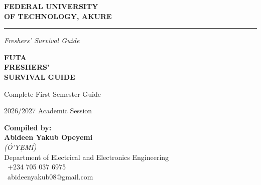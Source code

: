 \documentclass[11pt,a4paper]{article}
\begin{document}
\begin{titlepage}
    \centering


    \vspace*{1cm}

    {\color{white}\Huge\bfseries FEDERAL UNIVERSITY\\[0.3em] OF TECHNOLOGY, AKURE\par}

    \vspace{1cm}

    {\color{accent}\rule{10cm}{2pt}\par}

    \vspace{0.5cm}

    {\color{white}\Large\itshape Freshers' Survival Guide\par}

    \vspace{2cm}

    {\color{primary}\Huge\bfseries FUTA\\[0.3em] FRESHERS'\\[0.3em] SURVIVAL GUIDE\par}

    \vspace{0.5cm}

    {\color{primary}\Large Complete First Semester Guide\par}

    \vspace{0.3cm}

    {\color{textGray}\large 2026/2027 Academic Session\par}

    \vspace{2cm}

    \begin{tcolorbox}[colback=lightGray, colframe=primary, width=12cm, arc=6pt, boxsep=10pt]
        \centering
        {\color{primary}\textbf{Compiled by:}}\\[0.3em]
        {\Large\bfseries Abideen Yakub Opeyemi}\\[0.2em]
        {\itshape (Ó'YẸMÍ)}\\[0.5em]
        {\small Department of Electrical and Electronics Engineering}\\[0.3em]
        {\small\faPhone\ +234 705 037 6975}\\[0.2em]
        {\small\faEnvelope\ abideenyakub08@gmail.com}
    \end{tcolorbox}


\end{titlepage}
\end{document}
